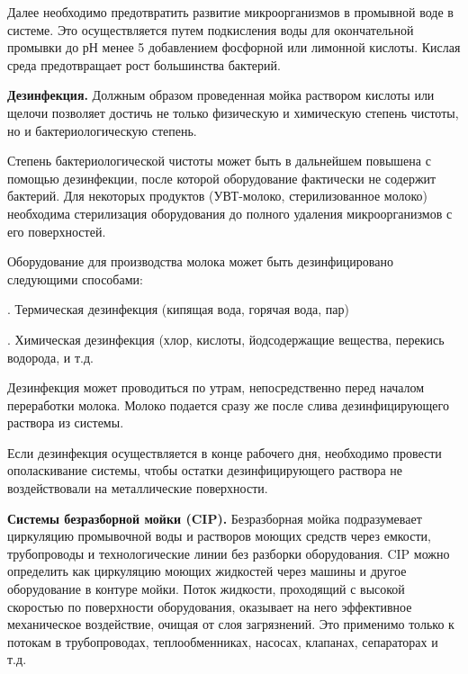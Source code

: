 {\par \redline Далее необходимо предотвратить развитие микроорганизмов в промывной воде в системе. Это осуществляется путем подкисления воды для окончательной промывки до рН менее 5 добавлением фосфорной или лимонной кислоты. Кислая среда предотвращает рост большинства бактерий.

\par \redline \textbf{Дезинфекция.} Должным образом проведенная мойка раствором кислоты или щелочи позволяет достичь не только физическую и химическую степень чистоты, но и бактериологическую степень.

\par \redline Степень бактериологической чистоты может быть в дальнейшем повышена с помощью дезинфекции, после которой оборудование фактически не содержит бактерий. Для некоторых продуктов (УВТ-молоко, стерилизованное молоко) необходима стерилизация оборудования до полного удаления микроорганизмов с его поверхностей.

\par \redline Оборудование для производства молока может быть дезинфицировано следующими способами:


\par {}. Термическая дезинфекция (кипящая вода, горячая вода, пар)
\par {}. Химическая дезинфекция (хлор, кислоты, йодсодержащие вещества, перекись водорода, и т.д.


\par \redline Дезинфекция может проводиться по утрам, непосредственно перед началом переработки молока. Молоко подается сразу же после слива дезинфицирующего раствора из системы.

\par \redline Если дезинфекция осуществляется в конце рабочего дня, необходимо провести ополаскивание системы, чтобы остатки дезинфицирующего раствора не воздействовали на металлические поверхности.

\par \redline \textbf{Системы безразборной мойки (CIP).} Безразборная мойка подразумевает циркуляцию промывочной воды и растворов моющих средств через емкости, трубопроводы и технологические линии без разборки оборудования. CIP можно определить как циркуляцию моющих жидкостей через машины и другое оборудование в контуре мойки. Поток жидкости, проходящий с высокой скоростью по поверхности оборудования, оказывает на него эффективное механическое воздействие, очищая от слоя загрязнений. Это применимо только к потокам в трубопроводах, теплообменниках, насосах, клапанах, сепараторах и т.д.

}
